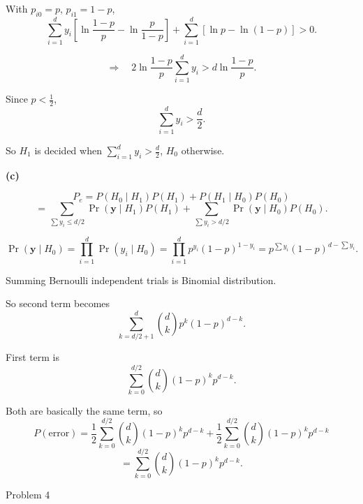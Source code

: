 \documentclass[12pt,a4paper,onecolumn]{exam}
\newcommand{\questionheader}[1]{%
  \begin{tcolorbox}[
    enhanced,
    colback=black,
    coltext=white,
    boxrule=0pt,
    fontupper=\Large\bfseries,
    arc=4mm
  ]
  #1
  \end{tcolorbox}%
}
\begin{document}
\begin{solution}
With $p_{i0}=p$, $p_{i1}=1-p$,
\[
\sum_{i=1}^{d}y_i\left[\ln\frac{1-p}{p}-\ln\frac{p}{1-p}\right]
+\sum_{i=1}^{d}[\ln p-\ln(1-p)]>0.
\]

\[
\Rightarrow\quad 2\ln\frac{1-p}{p}\sum_{i=1}^{d}y_i > d\ln\frac{1-p}{p}.
\]

Since $p<\tfrac{1}{2}$,
\[
\sum_{i=1}^{d}y_i > \frac{d}{2}.
\]

So $H_1$ is decided when $\sum_{i=1}^{d}y_i>\frac{d}{2}$, $H_0$ otherwise.

\textbf{(c)}

\[
P_e=P(H_0\mid H_1)P(H_1)+P(H_1\mid H_0)P(H_0)
\]
\[
=\sum_{\sum y_i\le d/2}\Pr(\mathbf{y}\mid H_1)P(H_1)
+\sum_{\sum y_i> d/2}\Pr(\mathbf{y}\mid H_0)P(H_0).
\]

\[
\Pr(\mathbf{y}\mid H_0)=\prod_{i=1}^{d}\Pr(y_i\mid H_0)
=\prod_{i=1}^{d}p^{y_i}(1-p)^{1-y_i}
= p^{\sum y_i}(1-p)^{d-\sum y_i}.
\]

Summing Bernoulli independent trials is Binomial distribution.

So second term becomes
\[
\sum_{k=d/2+1}^{d} \binom{d}{k} p^k(1-p)^{d-k}.
\]

First term is
\[
\sum_{k=0}^{d/2} \binom{d}{k}(1-p)^k p^{d-k}.
\]

Both are basically the same term, so
\[
P(\text{error})
=\frac{1}{2}\sum_{k=0}^{d/2}\binom{d}{k}(1-p)^k p^{d-k}
+\frac{1}{2}\sum_{k=0}^{d/2}\binom{d}{k}(1-p)^k p^{d-k}
\]
\[
=\sum_{k=0}^{d/2}\binom{d}{k}(1-p)^k p^{d-k}.
\]

\end{solution}

\questionheader{Problem 4}
\end{document}
